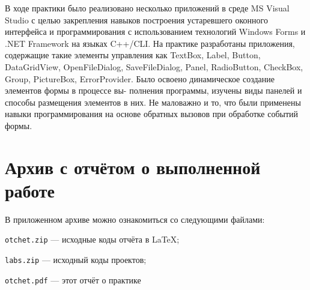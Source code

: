 \documentclass[pract]{SCWorks}
\begin{document}










\conclusion
В ходе практики было реализовано несколько приложений в среде MS
Visual Studio с целью закрепления навыков построения устаревшего оконного интерфейса и программирования с использованием технологий Windows Forms и .NET
Framework на языках C++/CLI.
На практике разработаны приложения, содержащие такие элементы управления как TextBox, Label, Button, DataGridView, OpenFileDialog, SaveFileDialog,
Panel, RadioButton, CheckBox, Group, PictureBox, ErrorProvider.
Было освоено динамическое создание элементов формы в процессе вы-
полнения программы, изучены виды панелей и способы размещения элементов
в них. Не маловажно и то, что были применены навыки программирования на
основе обратных вызовов при обработке событий формы.

\nocite{*}




\appendix
\section{Архив с отчётом о выполненной работе}
\label{application-A}
В приложенном архиве можно ознакомиться со следующими файлами:

\texttt{otchet.zip} --- исходные коды отчёта в \LaTeX;

\texttt{labs.zip} --- исходный коды проектов;

\texttt{otchet.pdf} --- этот отчёт о практике
\end{document}
